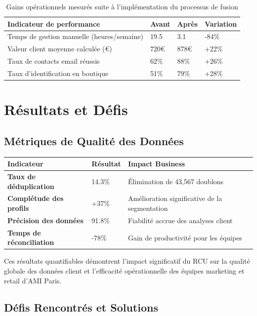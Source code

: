 \begin{table}[H]
\centering
\caption{Gains opérationnels mesurés suite à l'implémentation du processus de fusion}
\begin{tabular}{|p{6cm}|p{3cm}|p{3cm}|p{2cm}|}
\hline
\rowcolor{lightblue} \textbf{Indicateur de performance} & \textbf{Avant} & \textbf{Après} & \textbf{Variation} \\
\hline
Temps de gestion manuelle (heures/semaine) & 19.5 & 3.1 & -84\% \\
\hline
Valeur client moyenne calculée (€) & 720€ & 878€ & +22\% \\
\hline
Taux de contacts email réussis & 62\% & 88\% & +26\% \\
\hline
Taux d'identification en boutique & 51\% & 79\% & +28\% \\
\hline
\end{tabular}
\end{table}

\section{Résultats et Défis}

\subsection{Métriques de Qualité des Données}

\begin{center}
\begin{tabular}{|>{\bfseries}p{5cm}|p{3cm}|p{5cm}|}
\hline
\rowcolor{lightblue} Indicateur & Résultat & Impact Business \\
\hline
Taux de déduplication & 14.3\% & Élimination de 43,567 doublons \\
\hline
Complétude des profils & +37\% & Amélioration significative de la segmentation \\
\hline
Précision des données & 91.8\% & Fiabilité accrue des analyses client \\
\hline
Temps de réconciliation & -78\% & Gain de productivité pour les équipes \\
\hline
\end{tabular}
\end{center}

Ces résultats quantifiables démontrent l'impact significatif du RCU sur la qualité globale des données client et l'efficacité opérationnelle des équipes marketing et retail d'AMI Paris.

\subsection{Défis Rencontrés et Solutions}

